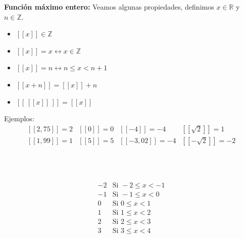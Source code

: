 \documentclass[11pt,a4paper]{article}
\newcommand{\ejes}[4]{%
  \draw[->] (#1,0) -- (#2,0) node[below] {$x$};
  \draw[->] (0,#3) -- (0,#4) node[left] {$y$};}
\begin{document}
\medskip
\textbf{Función máximo entero:} Veamos algunas propiedades, definimos $x \in \mathbb{R}$ y
$n \in \mathbb{Z}$.

\begin{minipage}[t]{0.388\textwidth}
\begin{itemize}
  \item $[\![x]\!] \in \mathbb{Z}$
  \item $[\![x]\!] = x \leftrightarrow x \in \mathbb{Z}$
  \item $[\![x]\!] = n \leftrightarrow n \leq x < n + 1$
  \item $[\![x + n]\!] = [\![x]\!] + n$
  \item $[\![\,[\![x]\!]\,]\!] = [\![x]\!]$
\end{itemize}
\end{minipage}\hfill
\begin{minipage}[t]{0.582\textwidth}
Ejemplos:
\[
\begin{array}{llll}
[\![2{,}75]\!] = 2 & [\![0]\!] = 0 & [\![-4]\!] = -4 & [\![\sqrt{2}]\!] = 1\\[4pt]
[\![1{,}99]\!] = 1 & [\![5]\!] = 5 & [\![-3{,}02]\!] = -4 & [\![-\sqrt{2}]\!] = -2
\end{array}
\]
\end{minipage}

\begin{minipage}{0.291\textwidth}
\centering
{}\\[8pt]
\\[4pt]
\end{minipage}\hfill
\begin{minipage}{0.407\textwidth}
\centering
{}
\end{minipage}\hfill
\begin{minipage}{0.272\textwidth}
\[
\begin{array}{r|l}
-2 & \text{Si } -2 \leq x < -1\\
-1 & \text{Si } -1 \leq x < 0\\
0 & \text{Si } 0 \leq x < 1\\
1 & \text{Si } 1 \leq x < 2\\
2 & \text{Si } 2 \leq x < 3\\
3 & \text{Si } 3 \leq x < 4
\end{array}
\]
\end{minipage}
\end{document}
